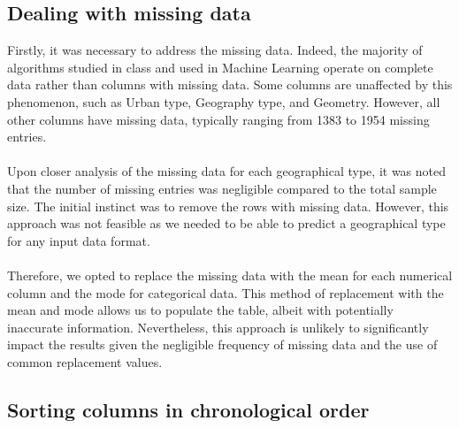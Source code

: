 \begin{center}
\end{center}

\subsection{Dealing with missing data}

Firstly, it was necessary to address the missing data. Indeed, the majority of algorithms studied in class and used in Machine Learning operate on complete data rather than columns with missing data. Some columns are unaffected by this phenomenon, such as Urban type, Geography type, and Geometry. However, all other columns have missing data, typically ranging from 1383 to 1954 missing entries. \\ \\
Upon closer analysis of the missing data for each geographical type, it was noted that the number of missing entries was negligible compared to the total sample size. The initial instinct was to remove the rows with missing data. However, this approach was not feasible as we needed to be able to predict a geographical type for any input data format.\\ \\
Therefore, we opted to replace the missing data with the mean for each numerical column and the mode for categorical data. This method of replacement with the mean and mode allows us to populate the table, albeit with potentially inaccurate information. Nevertheless, this approach is unlikely to significantly impact the results given the negligible frequency of missing data and the use of common replacement values.

\subsection{Sorting columns in chronological order}


